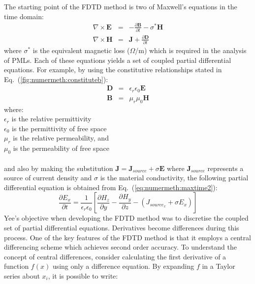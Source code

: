 \documentclass[a4paper, 12pt]{article}
\newcommand{\eq}[1]{Eq.\ (\ref{#1})}
\begin{document}
	The starting point of the FDTD method is two of Maxwell's equations in the
	time domain:
	\begin{eqnarray}
		\label{eq:numermeth:maxtime1}
		\nabla\times\mathbf{E}&=&-\frac{\partial\mathbf{B}}{\partial t}-\sigma^*\mathbf{H}\\
		\label{eq:numermeth:maxtime2}
		\nabla\times\mathbf{H}&=&\mathbf{J} + \frac{\partial\mathbf{D}}{\partial t}
	\end{eqnarray}
	where $\sigma^*$ is the equivalent magnetic loss ($\Omega$/m) which is
	required in the analysis of PMLs. Each of these equations yields a set of coupled partial differential
	equations. For example, by using the constitutive relationships
	stated in \eq{fig:numermeth:constituteb}:
	\begin{eqnarray}
		\label{fig:numermeth:constituted}
		\mathbf{D}&=&\epsilon_r\epsilon_0\mathbf{E}\\
		\mathbf{B}&=&\mu_r\mu_0\mathbf{H}
		\label{fig:numermeth:constituteb}
	\end{eqnarray}
	where:\\
	$\epsilon_r$ is the relative permittivity\\
	$\epsilon_0$ is the permittivity of free space\\
	$\mu_r$ is the relative permeability, and\\
	$\mu_0$ is the permeability of free space\\\\
	and also by making the substitution
	$\mathbf{J}=\mathbf{J}_{source}+\sigma\mathbf{E}$ where
	$\mathbf{J}_{source}$ represents a source of current density and
	$\sigma$ is the material conductivity, the
	following partial differential equation is obtained from \eq{eq:numermeth:maxtime2}:
	\begin{equation}
		\frac{\partial E_x}{\partial
			t}=\frac{1}{\epsilon_r\epsilon_0}\left[\frac{\partial H_z}{\partial
			y} - \frac{\partial H_y}{\partial z} - \left({J_{source_x}}+\sigma E_x\right)\right]
		\label{eq:numermeth:pde}
	\end{equation}
	Yee's objective when developing the FDTD method was to discretise
	the coupled set of partial differential equations. Derivatives become
	differences during this process. One of the key features of the FDTD
	method is that it employs a central differencing scheme which
	achieves second order accuracy. To understand the concept of central
	differences, consider calculating the first derivative of a function
	$f(x)$ using only a difference equation. By expanding $f$ in
	a Taylor series about $x_i$, it is possible to write:
\end{document}
